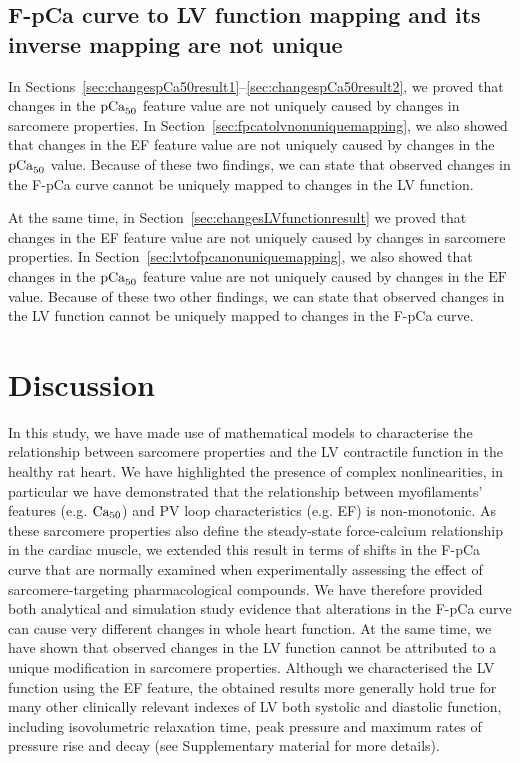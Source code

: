 %
%
%
\subsection{F-pCa curve to LV function mapping and its inverse mapping are not unique}\label{sec:ch8nonuniquemappings}
In Sections~\ref{sec:changespCa50result1}--\ref{sec:changespCa50result2}, we proved that changes in the $\textrm{pCa}_{50}$ feature value are not uniquely caused by changes in sarcomere properties. In Section~\ref{sec:fpcatolvnonuniquemapping}, we also showed that changes in the EF feature value are not uniquely caused by changes in the $\textrm{pCa}_{50}$ value. Because of these two findings, we can state that observed changes in the F-pCa curve cannot be uniquely mapped to changes in the LV function.

\vspace{0.2cm}
At the same time, in Section~\ref{sec:changesLVfunctionresult} we proved that changes in the EF feature value are not uniquely caused by changes in sarcomere properties. In Section~\ref{sec:lvtofpcanonuniquemapping}, we also showed that changes in the $\textrm{pCa}_{50}$ feature value are not uniquely caused by changes in the $\textrm{EF}$ value. Because of these two other findings, we can state that observed changes in the LV function cannot be uniquely mapped to changes in the F-pCa curve.


%
%
%
\section{Discussion}\label{sec:ch8discussion}

\noindent
In this study, we have made use of mathematical models to characterise the relationship between sarcomere properties and the LV contractile function in the healthy rat heart. We have highlighted the presence of complex nonlinearities, in particular we have demonstrated that the relationship between myofilaments' features (e.g. $\textrm{Ca}_{50}$) and PV loop characteristics (e.g. EF) is non-monotonic. As these sarcomere properties also define the steady-state force-calcium relationship in the cardiac muscle, we extended this result in terms of shifts in the F-pCa curve that are normally examined when experimentally assessing the effect of sarcomere-targeting pharmacological compounds. We have therefore provided both analytical and simulation study evidence that alterations in the F-pCa curve can cause very different changes in whole heart function. At the same time, we have shown that observed changes in the LV function cannot be attributed to a unique modification in sarcomere properties. Although we characterised the LV function using the EF feature, the obtained results more generally hold true for many other clinically relevant indexes of LV both systolic and diastolic function, including isovolumetric relaxation time, peak pressure and maximum rates of pressure rise and decay (see Supplementary material for more details).

